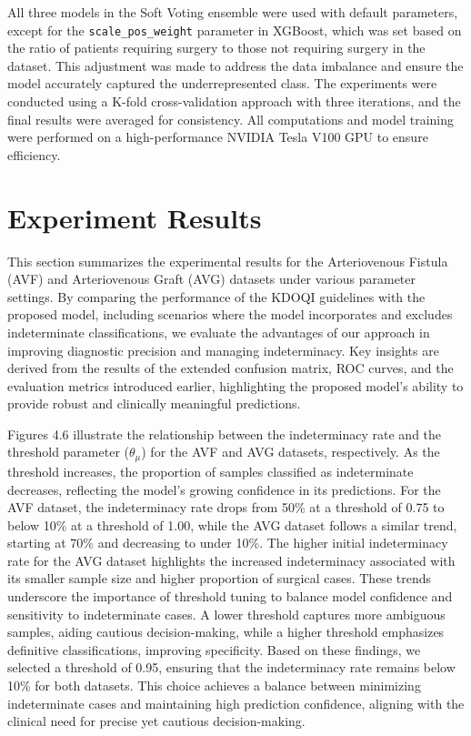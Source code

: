 All three models in the Soft Voting ensemble were used with default parameters, except for the \texttt{scale\_pos\_weight} parameter in XGBoost, which was set based on the ratio of patients requiring surgery to those not requiring surgery in the dataset. This adjustment was made to address the data imbalance and ensure the model accurately captured the underrepresented class. The experiments were conducted using a K-fold cross-validation approach with three iterations, and the final results were averaged for consistency. All computations and model training were performed on a high-performance NVIDIA Tesla V100 GPU to ensure efficiency.
\newpage

\section{Experiment Results}

This section summarizes the experimental results for the Arteriovenous Fistula (AVF) and Arteriovenous Graft (AVG) datasets under various parameter settings. By comparing the performance of the KDOQI guidelines with the proposed model, including scenarios where the model incorporates and excludes indeterminate classifications, we evaluate the advantages of our approach in improving diagnostic precision and managing indeterminacy. Key insights are derived from the results of the extended confusion matrix, ROC curves, and the evaluation metrics introduced earlier, highlighting the proposed model’s ability to provide robust and clinically meaningful predictions.

Figures 4.6 illustrate the relationship between the indeterminacy rate and the threshold parameter (\(\theta_{\mu}\)) for the AVF and AVG datasets, respectively. As the threshold increases, the proportion of samples classified as indeterminate decreases, reflecting the model's growing confidence in its predictions. For the AVF dataset, the indeterminacy rate drops from 50\% at a threshold of 0.75 to below 10\% at a threshold of 1.00, while the AVG dataset follows a similar trend, starting at 70\% and decreasing to under 10\%. The higher initial indeterminacy rate for the AVG dataset highlights the increased indeterminacy associated with its smaller sample size and higher proportion of surgical cases. These trends underscore the importance of threshold tuning to balance model confidence and sensitivity to indeterminate cases. A lower threshold captures more ambiguous samples, aiding cautious decision-making, while a higher threshold emphasizes definitive classifications, improving specificity. Based on these findings, we selected a threshold of 0.95, ensuring that the indeterminacy rate remains below 10\% for both datasets. This choice achieves a balance between minimizing indeterminate cases and maintaining high prediction confidence, aligning with the clinical need for precise yet cautious decision-making.

